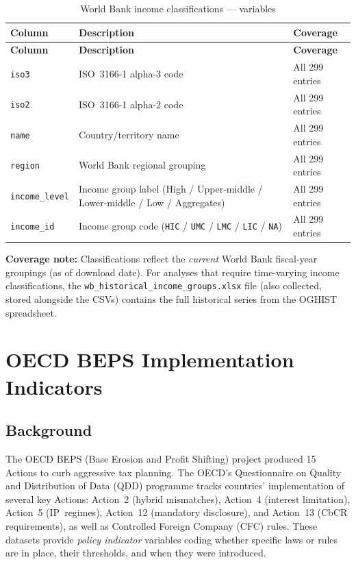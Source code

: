 \documentclass[11pt,a4paper]{article}
\begin{document}
\begin{longtable}{L{2.8cm} L{6.0cm} C{2.0cm}}
    \caption{World Bank income classifications --- variables}
    \label{tab:wb_income}\\
    \toprule
    \textbf{Column} & \textbf{Description} & \textbf{Coverage} \\
    \midrule
    \endfirsthead
    \toprule
    \textbf{Column} & \textbf{Description} & \textbf{Coverage} \\
    \midrule
    \endhead
    \bottomrule
    \endlastfoot
    \texttt{iso3}         & ISO~3166-1 alpha-3 code & All 299 entries \\
    \texttt{iso2}         & ISO~3166-1 alpha-2 code & All 299 entries \\
    \texttt{name}         & Country/territory name & All 299 entries \\
    \texttt{region}       & World Bank regional grouping & All 299 entries \\
    \texttt{income\_level}& Income group label (High / Upper-middle / Lower-middle / Low / Aggregates) & All 299 entries \\
    \texttt{income\_id}   & Income group code (\texttt{HIC} / \texttt{UMC} / \texttt{LMC} / \texttt{LIC} / \texttt{NA}) & All 299 entries \\
\end{longtable}

\noindent\textbf{Coverage note:} Classifications reflect the \emph{current}
World Bank fiscal-year groupings (as of download date).  For analyses that
require time-varying income classifications, the \texttt{wb\_historical\_income\_groups.xlsx}
file (also collected, stored alongside the CSVs) contains the full historical
series from the OGHIST spreadsheet.


\section{OECD BEPS Implementation Indicators}
\label{sec:beps}

\subsection{Background}
\label{subsec:beps_background}

The OECD BEPS (Base Erosion and Profit Shifting) project produced 15 Actions to
curb aggressive tax planning.  The OECD's Questionnaire on Quality and
Distribution of Data (QDD) programme tracks countries' implementation of several
key Actions: Action~2 (hybrid mismatches), Action~4 (interest limitation),
Action~5 (IP~regimes), Action~12 (mandatory disclosure), and Action~13 (CbCR
requirements), as well as Controlled Foreign Company (CFC) rules.  These
datasets provide \emph{policy indicator} variables coding whether specific laws
or rules are in place, their thresholds, and when they were introduced.
\end{document}
